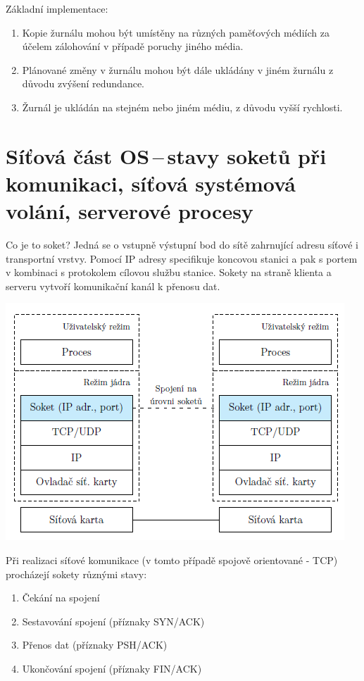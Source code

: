 Základní implementace:

\begin{enumerate}
    \item Kopie žurnálu mohou být umístěny na různých paměťových médiích za účelem zálohování v případě poruchy jiného média.
    \item Plánované změny v žurnálu mohou být dále ukládány v jiném žurnálu z důvodu zvýšení redundance.
    \item Žurnál je ukládán na stejném nebo jiném médiu, z důvodu vyšší rychlosti. 
\end{enumerate}


\newpage
\section{Síťová část OS\,--\,stavy soketů při komunikaci, síťová systémová volání, serverové procesy}

Co je to soket? Jedná se o vstupně výstupní bod do sítě zahrnující adresu síťové i transportní vrstvy. Pomocí IP adresy specifikuje koncovou stanici a pak s portem v kombinaci s protokolem cílovou službu stanice. Sokety na straně klienta a serveru vytvoří komunikační kanál k přenosu dat.

\begin{center}
    \includegraphics[scale=1]{images/network_socket.png}
\end{center}

Při realizaci síťové komunikace (v tomto případě spojově orientované - TCP) procházejí sokety různými stavy:
\begin{enumerate}
    \item Čekání na spojení
    \item Sestavování spojení (příznaky SYN/ACK)
    \item Přenos dat (příznaky PSH/ACK)
    \item Ukončování spojení (příznaky FIN/ACK)
\end{enumerate}

